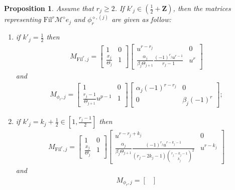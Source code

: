 \documentclass[11pt]{amsart}
\theoremstyle{definition}
\numberwithin{equation}{subsection}
\theoremstyle{plain}
\theoremstyle{plain}
\theoremstyle{plain}
\theoremstyle{plain}
\theoremstyle{plain}
\theoremstyle{plain}
\theoremstyle{plain}
\theoremstyle{plain}
\newtheorem{prop}[equation]{Proposition}
\theoremstyle{plain}
\theoremstyle{plain}
\theoremstyle{plain}
\theoremstyle{plain}
\theoremstyle{definition}
\theoremstyle{definition}
\theoremstyle{definition}
\theoremstyle{remark}
\renewcommand{\(}{\textup{(}}
\renewcommand{\)}{\textup{)}}
\newcommand{\Z}{\mathbf{Z}}
\newcommand{\cM}{\mathcal{M}}
\newcommand{\Fil}{\mathrm{Fil}}
\begin{document}
\begin{prop}\label{prop: mod p reduction, r_j>=2, k'_j half integer}
Assume that $r_j\geq 2$. If $k'_j\in (\frac{1}{2}+\Z)$, then the matrices representing $\Fil^r\cM^\diamond e_j$ and $\phi_r^{\diamond,(j)}$ are given as follow:
\begin{enumerate}[leftmargin=*]
\item if $k'_j=\frac{1}{2}$ then
    \begin{align*}
    M_{\Fil^r,j}
        =
        \begin{bmatrix}
            1 & 0 \\
            \frac{x_j}{\Theta_j} & 1
        \end{bmatrix}
        \begin{bmatrix}
            u^{r-r_j} & 0 \\
            \frac{\alpha_j}{\beta_j\Theta_{j+1}}\frac{(-1)^{r_j}u^{r-1}}{r_j-1} & u^r
        \end{bmatrix}
    \end{align*}
    and
    \begin{align*}
    M_{\phi_r,j}
        =
        \begin{bmatrix}
            1 & 0 \\
            \frac{r_j-1}{\Theta_{j+1}}u^{p-1} & 1
        \end{bmatrix}
        \begin{bmatrix}
            \alpha_j (-1)^{r-r_j} & 0 \\
            0 & \beta_j (-1)^r
        \end{bmatrix};
    \end{align*}
\item if $k'_j=k_j+\frac{1}{2}\in[1,\frac{r_j-1}{2}]$ then
    \begin{align*}
    M_{\Fil^r,j}
        =
        \begin{bmatrix}
            1 & 0 \\
            \frac{x_j}{\Theta_j} & 1
        \end{bmatrix}
        \begin{bmatrix}
            u^{r-r_j+k_j} & 0 \\
            \frac{\alpha_j}{\beta_j\Theta_{j+1}}\frac{(-1)^{r_j}u^{r-k_j-1}}{(r_j-2k_j-1)\binom{r_j-k_j-1}{k_j}^2} & u^{r-k_j}
        \end{bmatrix}
    \end{align*}
    and
    \begin{align*}
    M_{\phi_r,j}
        =
        \begin{bmatrix}

\end{bmatrix}
\end{align*}
\end{enumerate}
\end{prop}
\end{document}
